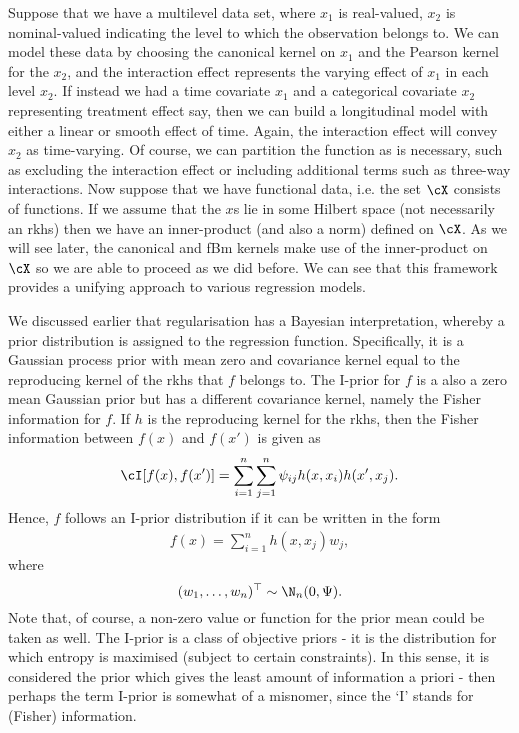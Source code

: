 Suppose that we have a multilevel data set, where $x_1$ is real-valued, $x_2$ is nominal-valued indicating the level to which the observation belongs to. 
We can model these data by choosing the canonical kernel on $x_1$ and the Pearson kernel for the $x_2$, and the interaction effect represents the varying effect of $x_1$ in each level $x_2$. 
If instead we had a time covariate $x_1$ and a categorical covariate $x_2$ representing treatment effect say, then we can build a longitudinal model with either a linear or smooth effect of time. 
Again, the interaction effect will convey $x_2$ as time-varying. 
Of course, we can partition the function as is necessary, such as excluding the interaction effect or including additional terms such as three-way interactions. Now suppose that we have functional data, i.e. the set $\cX$ consists of functions. 
If we assume that the $x$s lie in some Hilbert space (not necessarily an \gls{rkhs}) then we have an inner-product (and also a norm) defined on $\cX$.
As we will see later, the canonical and fBm kernels make use of the inner-product on $\cX$ so we are able to proceed as we did before.
We can see that this framework provides a unifying approach to various regression models.


We discussed earlier that regularisation has a Bayesian interpretation, whereby a prior distribution is assigned to the regression function.
Specifically, it is a Gaussian process prior with mean zero and covariance kernel equal to the reproducing kernel of the \gls{rkhs} that $f$ belongs to. 
The I-prior for $f$ is a also a zero mean Gaussian prior but has a different covariance kernel, namely the Fisher information for $f$. If $h$ is the reproducing kernel for the \gls{rkhs}, then the Fisher information between $f(x)$ and $f(x')$ is given as
\begin{align}\label{eq:fisherinformation}
  \cI[f(x),f(x')] = \sum_{i=1}^n \sum_{j=1}^n \psi_{ij}h(x,x_i)h(x',x_j).   
\end{align} 
Hence, $f$ follows an I-prior distribution if it can be written in the form
\begin{align}%
  f(x) = \sum_{i=1}^n h(x,x_j)w_j,
\end{align}
where 
\[
  (w_1, \dots, w_n)^\top \sim \N_n(0, \Psi).  
\]
Note that, of course, a non-zero value or function for the prior mean could be taken as well.
The I-prior is a class of objective priors - it is the distribution for which  entropy is maximised (subject to certain constraints).
In this sense, it is considered the prior which gives the least amount of information a priori - then perhaps the term I-prior is somewhat of a misnomer, since the `I' stands for (Fisher) information.


